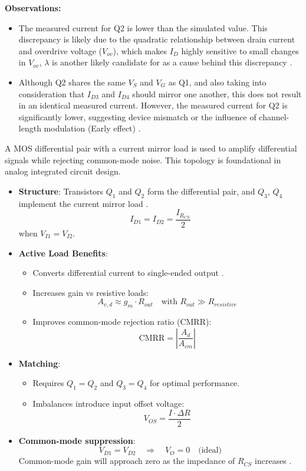 \newpage

\noindent\textbf{Observations:}
\begin{itemize}
    \item The measured current for Q2 is lower than the simulated value. This discrepancy is likely due to the quadratic relationship between drain current and overdrive voltage ($V_{ov}$), which makes $I_D$ highly sensitive to small changes in $V_{ov}$, $\lambda$ is another likely candidate for as a cause behind this discrepancy \cite{rajesh_differential_2014}.
    \item Although Q2 shares the same $V_S$ and $V_{G}$ as Q1, and also taking into consideration that $I_{D3}$ and $I_{D4}$ should mirror one another, this does not result in an identical measured current. However, the measured current for Q2 is significantly lower, suggesting device mismatch or the influence of channel-length modulation (Early effect) \cite{fonstad_mit2009}.
\end{itemize}

\justifying

A MOS differential pair with a current mirror load is used to amplify differential signals while rejecting common-mode noise. This topology is foundational in analog integrated circuit design.

\begin{itemize}
    \item \textbf{Structure}: Transistors $Q_1$ and $Q_2$ form the differential pair, and $Q_3$, $Q_4$ implement the current mirror load \cite{fonstad_mit2009}.
    \[
    I_{D1} = I_{D2} = \frac{I_{R_{CS}}}{2}
    \]
    when \( V_{I1} = V_{I2} \).
    \item \textbf{Active Load Benefits}:
    \begin{itemize}
        \item Converts differential current to single-ended output \cite{rajesh_differential_2014}.
        \item Increases gain vs resistive loads:
        \[
        A_{v,d} \approx g_m \cdot R_{out} \quad \text{with } R_{out} \gg R_{resistive}
        \]
        \item Improves common-mode rejection ratio (CMRR):
        \[
        \text{CMRR} = \left| \frac{A_{d}}{A_{cm}} \right|
        \]
    \end{itemize}
    \item \textbf{Matching}:
    \begin{itemize}
        \item Requires \( Q_1 = Q_2 \) and \( Q_3 = Q_4 \) for optimal performance.
        \item Imbalances introduce input offset voltage:
        \[
        V_{OS} = \frac{I \cdot \Delta R}{2}
        \]
    \end{itemize}
    \item \textbf{Common-mode suppression}:
    \[
    V_{D1} = V_{D2} \quad \Rightarrow \quad V_O = 0 \quad \text{(ideal)}
    \]
    Common-mode gain will approach zero as the impedance of $R_{CS}$ increases \cite{deo2020bimos}.
\end{itemize}


